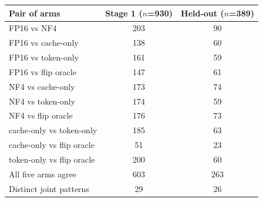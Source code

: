 \begin{tabular}{lcc}
\toprule
Pair of arms & Stage 1 ($n$=930) & Held-out ($n$=389) \\
\midrule
FP16 vs NF4 & 203 & 90 \\
FP16 vs cache-only & 138 & 60 \\
FP16 vs token-only & 161 & 59 \\
FP16 vs flip oracle & 147 & 61 \\
NF4 vs cache-only & 173 & 74 \\
NF4 vs token-only & 174 & 59 \\
NF4 vs flip oracle & 176 & 73 \\
cache-only vs token-only & 185 & 63 \\
cache-only vs flip oracle & 51 & 23 \\
token-only vs flip oracle & 200 & 60 \\
\midrule
All five arms agree & 603 & 263 \\
Distinct joint patterns & 29 & 26 \\
\bottomrule
\end{tabular}
